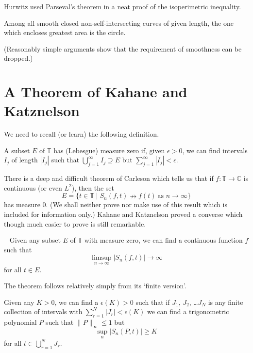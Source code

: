 Hurwitz used Parseval's theorem in a neat proof of the
isoperimetric inequality.
\begin{theorem} Among all smooth closed
non-self-intersecting curves of given length,
the one which encloses greatest area is the circle.
\end{theorem}
(Reasonably simple arguments show that the requirement of smoothness
can be dropped.)
\section{A Theorem of Kahane and Katznelson}
We need to recall (or learn) the following definition.
\begin{definition} A subset $E$ of ${\mathbb T}$
has (Lebesgue) measure zero if, given $\epsilon>0$,
we can find intervals $I_{j}$ of length $|I_{j}|$
such that $\bigcup_{j=1}^{\infty}I_{j}\supseteq E$
but $\sum_{j=1}^{\infty}|I_{j}|<\epsilon$.
\end{definition}

There is a deep and difficult theorem of Carleson
which tells us that if $f:{\mathbb T}\rightarrow{\mathbb C}$
is continuous (or even $L^{2}$), then the set
\[E=\{t\in {\mathbb T}\mid S_{n}(f,t)\nrightarrow f(t)
\ \text{as $n\rightarrow\infty$}\}\]
has measure $0$. (We shall neither prove nor
make use of this result which is included
for information only.) Kahane and Katznelson
proved a converse which though much easier to prove
is still remarkable.

\begin{theorem}%
~\label{Kahane and Katznelson} Given
any  subset $E$ of ${\mathbb T}$ with
measure zero, we can find a continuous function $f$
such that
\[\limsup_{n\rightarrow\infty}|S_{n}(f,t)|\rightarrow\infty\]
for all $t\in E$.
\end{theorem}

The theorem follows relatively simply from its
`finite version'.
\begin{lemma}\label{Finite Katznelson}
Given any $K>0$, we can find a $\epsilon(K)>0$
such that if $J_{1}$, $J_{2}$, \dots $J_{N}$ is any
finite collection of intervals with
$\sum_{r=1}^{N}|J_{r}|<\epsilon(K)$
we can find a trigonometric polynomial $P$
such that $\|P\|_{\infty}\leq 1$ but
\[\sup_{n}|S_{n}(P,t)|\geq K\]
for all $t\in \bigcup_{r=1}^{N}J_{r}$.
\end{lemma}


